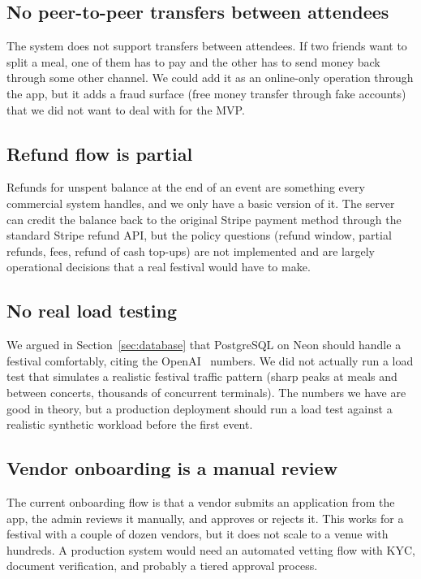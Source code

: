 \subsection{No peer-to-peer transfers between attendees}
\label{subsec:limitation-p2p}

The system does not support transfers between attendees. If two friends want to split a meal, one of them has to pay and the other has to send money back through some other channel. We could add it as an online-only operation through the app, but it adds a fraud surface (free money transfer through fake accounts) that we did not want to deal with for the MVP.

\subsection{Refund flow is partial}
\label{subsec:limitation-refunds}

Refunds for unspent balance at the end of an event are something every commercial system handles, and we only have a basic version of it. The server can credit the balance back to the original Stripe payment method through the standard Stripe refund API, but the policy questions (refund window, partial refunds, fees, refund of cash top-ups) are not implemented and are largely operational decisions that a real festival would have to make.

\subsection{No real load testing}
\label{subsec:limitation-load-testing}

We argued in Section~\ref{sec:database} that PostgreSQL on Neon should handle a festival comfortably, citing the OpenAI~\cite{OpenAIPostgres2026} numbers. We did not actually run a load test that simulates a realistic festival traffic pattern (sharp peaks at meals and between concerts, thousands of concurrent terminals). The numbers we have are good in theory, but a production deployment should run a load test against a realistic synthetic workload before the first event.

\subsection{Vendor onboarding is a manual review}
\label{subsec:limitation-vendor-onboarding}

The current onboarding flow is that a vendor submits an application from the app, the admin reviews it manually, and approves or rejects it. This works for a festival with a couple of dozen vendors, but it does not scale to a venue with hundreds. A production system would need an automated vetting flow with KYC, document verification, and probably a tiered approval process.

